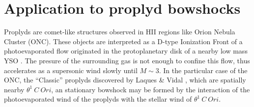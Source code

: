 \section{Application to proplyd bowshocks}
\label{sec:application}

Proplyds are comet-like structures observed in HII regions like Orion Nebula Cluster (ONC). 
These objects are interpreted as a D-type Ionization Front of a photoevaporated flow 
originated in the protoplanetary disk of a nearby low mass YSO \citep{Johnstone:1998}.
The presure of the surrounding gas is not enough to confine this flow, thus accelerates as a 
supersonic wind slowly until $M \sim 3$. In the particular case of the ONC, the ``Classic'' proplyds
discovered by Laques \& Vidal \citep{Laques:1979}, which are spatially nearby $\theta^1~C~Ori$, an stationary bowshock
may be formed by the interaction of the photoevaporated wind of the proplyds with the stellar wind of $\theta^1~C~Ori$.
